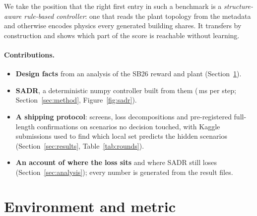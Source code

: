 \documentclass{article}
\begin{document}
We take the position that the right first entry in such a benchmark is a \emph{structure-aware rule-based controller}: one that reads the plant topology from the metadata and otherwise encodes physics every generated building shares. It transfers by construction and shows which part of the score is reachable without learning.

\paragraph{Contributions.}
\begin{itemize}
\item \textbf{Design facts} from an analysis of the SB26 reward and plant (Section~\ref{sec:env}).
\item \textbf{SADR}, a deterministic numpy controller built from them (\PolicyMsOurs{}\,ms per step; Section~\ref{sec:method}, Figure~\ref{fig:sadr}).
\item \textbf{A shipping protocol}: screens, loss decompositions and pre-registered full-length confirmations on scenarios no decision touched, with Kaggle submissions used to find which local set predicts the hidden scenarios (Section~\ref{sec:results}, Table~\ref{tab:rounds}).
\item \textbf{An account of where the loss sits} and where SADR still loses (Section~\ref{sec:analysis}); every number is generated from the result files.
\end{itemize}

\section{Environment and metric}
\label{sec:env}
\end{document}
